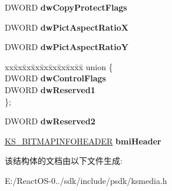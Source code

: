 \begin{DoxyCompactItemize}
D\+W\+O\+RD {\bfseries dw\+Copy\+Protect\+Flags}
\item 
\mbox{\label{structtag_k_s___v_i_d_e_o_i_n_f_o_h_e_a_d_e_r2_acf7e354d9986a49501035b33f3d826ef}} 
D\+W\+O\+RD {\bfseries dw\+Pict\+Aspect\+RatioX}
\item 
\mbox{\label{structtag_k_s___v_i_d_e_o_i_n_f_o_h_e_a_d_e_r2_a4ed8f4665121a30a954bf43a7d15a4b0}} 
D\+W\+O\+RD {\bfseries dw\+Pict\+Aspect\+RatioY}
\item 
\mbox{\label{structtag_k_s___v_i_d_e_o_i_n_f_o_h_e_a_d_e_r2_a8f58ba7af10711fa753252e82c6762d8}} 
\begin{tabbing}
xx\=xx\=xx\=xx\=xx\=xx\=xx\=xx\=xx\=\kill
union \{\\
\>DWORD {\bfseries dwControlFlags}\\
\>DWORD {\bfseries dwReserved1}\\
\}; \\

\end{tabbing}\item 
\mbox{\label{structtag_k_s___v_i_d_e_o_i_n_f_o_h_e_a_d_e_r2_adc01743deccf6bc808a6cfcd94d69abb}} 
D\+W\+O\+RD {\bfseries dw\+Reserved2}
\item 
\mbox{\label{structtag_k_s___v_i_d_e_o_i_n_f_o_h_e_a_d_e_r2_a5919b7e6342d10ed2bcb69ba49a5b6fb}} 
\hyperlink{structtag_k_s___b_i_t_m_a_p_i_n_f_o_h_e_a_d_e_r}{K\+S\+\_\+\+B\+I\+T\+M\+A\+P\+I\+N\+F\+O\+H\+E\+A\+D\+ER} {\bfseries bmi\+Header}
\end{DoxyCompactItemize}


该结构体的文档由以下文件生成\+:\begin{DoxyCompactItemize}
\item 
E\+:/\+React\+O\+S-\/0../sdk/include/psdk/ksmedia.\+h\end{DoxyCompactItemize}
